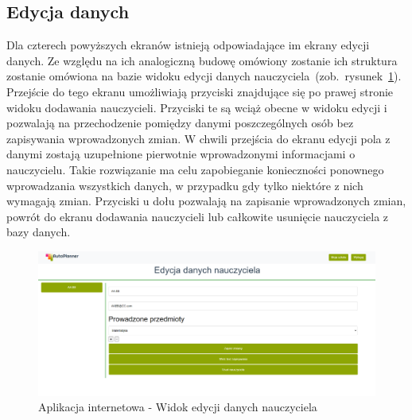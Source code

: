 \subsection{Edycja danych}
Dla czterech powyższych ekranów istnieją odpowiadające im ekrany edycji danych. Ze względu na ich analogiczną budowę omówiony zostanie ich struktura zostanie omówiona na bazie widoku edycji danych nauczyciela~(zob.~rysunek~\ref{rys:edit}). Przejście do tego ekranu umożliwiają przyciski znajdujące się po prawej stronie widoku dodawania nauczycieli. Przyciski te są wciąż obecne w widoku edycji i pozwalają na przechodzenie pomiędzy danymi poszczególnych osób bez zapisywania wprowadzonych zmian. W chwili przejścia do ekranu edycji pola z danymi zostają uzupełnione pierwotnie wprowadzonymi informacjami o nauczycielu. Takie rozwiązanie ma celu zapobieganie konieczności ponownego wprowadzania wszystkich danych, w przypadku gdy tylko niektóre z nich wymagają zmian. Przyciski u dołu pozwalają na zapisanie wprowadzonych zmian, powrót do ekranu dodawania nauczycieli lub całkowite usunięcie nauczyciela z bazy danych.
\begin{figure}[!ht]
\centering\includegraphics[width=\textwidth]{figures/edit}
\caption{Aplikacja internetowa - Widok edycji danych nauczyciela}\label{rys:edit}
\end{figure}




